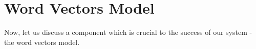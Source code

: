 

\section{Word Vectors Model}\label{sec:latent_wv_model}
Now, let us discuss a component which is crucial to the success of our system - the word vectors model. \\
